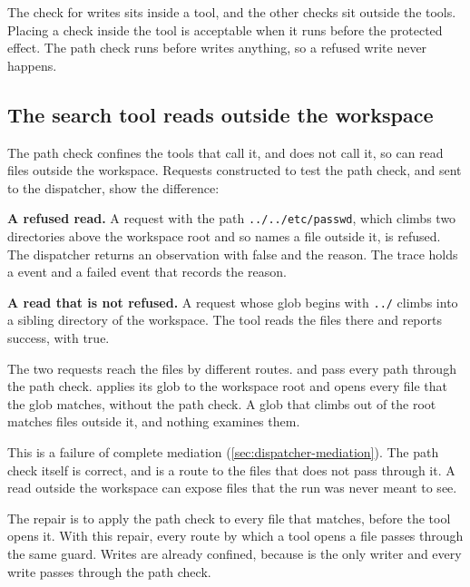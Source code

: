 The check for writes sits inside a tool, and the other checks sit outside the tools. Placing a check
inside the tool is acceptable when it runs before the protected effect. The path check runs before
 writes anything, so a refused write never happens.

\subsection{The search tool reads outside the workspace}
\label{sec:dispatcher-search}

The path check confines the tools that call it, and  does not call it, so
 can read files outside the workspace. Requests constructed to test the path check,
and sent to the dispatcher, show the difference:
\bi
\item \textbf{A refused read.} A  request with the path
\texttt{../../etc/passwd}, which climbs two directories above the workspace root and so names a
file outside it, is refused. The dispatcher returns an observation with  false and the reason. The trace
holds a  event and a failed  event that records the
reason.
\item \textbf{A read that is not refused.} A  request whose glob begins with
\texttt{../} climbs into a sibling directory of the workspace. The tool reads the files there and
reports success, with  true.
\ei

The two requests reach the files by different routes.  and  pass
every path through the path check.  applies its glob to the workspace root and opens
every file that the glob matches, without the path check. A glob that climbs out of the root matches
files outside it, and nothing examines them.

This is a failure of complete mediation (\cref{sec:dispatcher-mediation}). The path check itself is
correct, and  is a route to the files that does not pass through it. A read outside
the workspace can expose files that the run was never meant to see.

The repair is to apply the path check to every file that  matches, before the tool
opens it. With this repair, every route by which a tool opens a file passes through the same guard.
Writes are already confined, because  is the only writer and every write passes
through the path check.

